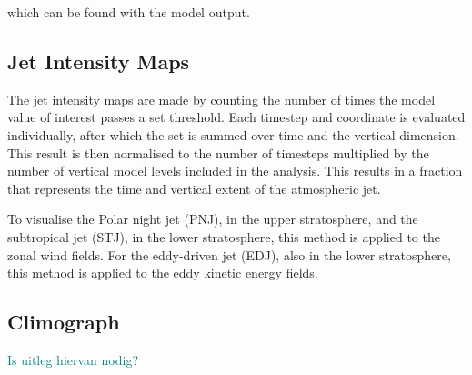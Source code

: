which can be found with the model output. 

\subsection{Jet Intensity Maps}
The jet intensity maps are made by counting the number of times the model value of interest passes a set threshold. Each timestep and coordinate is evaluated individually, after which the set is summed over time and the vertical dimension. This result is then normalised to the number of timesteps multiplied by the number of vertical model levels included in the analysis. This results in a fraction that represents the time and vertical extent of the atmospheric jet. 

To visualise the Polar night jet (PNJ), in the upper stratosphere, and the subtropical jet (STJ), in the lower stratosphere, this method is applied to the zonal wind fields. For the eddy-driven jet (EDJ), also in the lower stratosphere, this method is applied to the eddy kinetic energy fields. 


\subsection{Climograph}
\textcolor{teal}{Is uitleg hiervan nodig?}